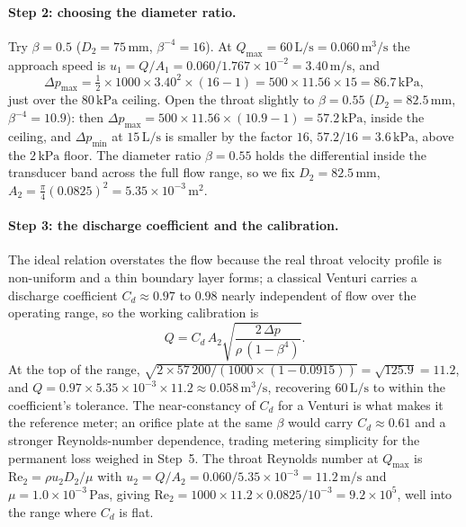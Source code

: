 \paragraph{Step 2: choosing the diameter ratio.} Try $\beta = 0.5$
($D_2 = 75\,\si{\milli\meter}$, $\beta^{-4} = 16$). At $Q_\text{max} =
60\,\text{L/s} = 0.060\,\si{\meter\cubed\per\second}$ the approach
speed is $u_1 = Q/A_1 = 0.060/1.767\times 10^{-2} =
3.40\,\si{\meter\per\second}$, and
\[
\Delta p_\text{max} = \tfrac12\times 1000\times 3.40^2\times(16 - 1)
= 500\times 11.56\times 15 = 86.7\,\text{kPa},
\]
just over the $80\,\text{kPa}$ ceiling. Open the throat slightly to
$\beta = 0.55$ ($D_2 = 82.5\,\si{\milli\meter}$, $\beta^{-4} =
10.9$): then $\Delta p_\text{max} = 500\times 11.56\times(10.9 - 1) =
57.2\,\text{kPa}$, inside the ceiling, and $\Delta p_\text{min}$ at
$15\,\text{L/s}$ is smaller by the factor $16$, $57.2/16 =
3.6\,\text{kPa}$, above the $2\,\text{kPa}$ floor. The diameter ratio
$\beta = 0.55$ holds the differential inside the transducer band
across the full flow range, so we fix $D_2 = 82.5\,\si{\milli\meter}$,
$A_2 = \tfrac{\pi}{4}(0.0825)^2 = 5.35\times 10^{-3}\,\si{\meter}^2$.

\paragraph{Step 3: the discharge coefficient and the calibration.} The
ideal relation overstates the flow because the real throat velocity
profile is non-uniform and a thin boundary layer forms; a classical
Venturi carries a discharge coefficient $C_d \approx 0.97$ to $0.98$
nearly independent of flow over the operating range, so the working
calibration is
\[
Q = C_d\,A_2\sqrt{\frac{2\,\Delta p}{\rho\,(1 - \beta^4)}}.
\]
At the top of the range, $\sqrt{2\times 57\,200/(1000\times(1 -
0.0915))} = \sqrt{125.9} = 11.2$, and $Q = 0.97\times 5.35\times
10^{-3}\times 11.2 \approx 0.058\,\text{m}^3/\text{s}$, recovering $60\,\text{L/s}$ to within the
coefficient's tolerance. The near-constancy of $C_d$ for a Venturi is
what makes it the reference meter; an orifice plate at the same
$\beta$ would carry $C_d \approx 0.61$ and a stronger Reynolds-number
dependence, trading metering simplicity for the permanent loss
weighed in Step~5. The throat Reynolds number at $Q_\text{max}$ is
$\mathrm{Re}_2 = \rho u_2 D_2/\mu$ with $u_2 = Q/A_2 = 0.060/5.35\times
10^{-3} = 11.2\,\si{\meter\per\second}$ and $\mu = 1.0\times
10^{-3}\,\si{\pascal\second}$, giving $\mathrm{Re}_2 = 1000\times
11.2\times 0.0825/10^{-3} = 9.2\times 10^5$, well into the range where
$C_d$ is flat.

